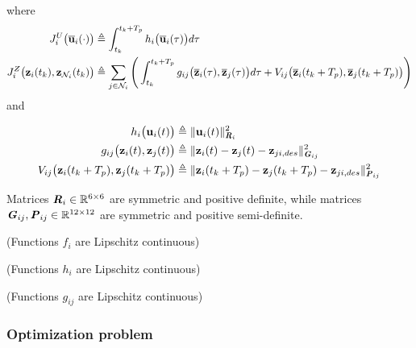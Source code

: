 where
\begin{align}
  J_i^U \big(\overline{\bm{\mathbf{u}}}_i (\cdot)\big) &\triangleq
    \int_{t_k}^{t_k + T_p} h_i \big(\overline{\bm{\mathbf{u}}}_i (\tau)\big) d \tau \\
  J_i^Z \big(\bm{\mathbf{z}}_i (t_k), \bm{\mathbf{z}}_{\mathcal{N}_i}(t_k)\big) & \triangleq
    \sum_{j \in \mathcal{N}_i} \Bigg(\int_{t_k}^{t_k + T_p} g_{ij} \big(\overline{\bm{\mathbf{z}}}_i (\tau), \overline{\bm{\mathbf{z}}}_j (\tau)\big) d \tau +
    V_{ij} \big(\overline{\bm{\mathbf{z}}}_i (t_k + T_p), \overline{\bm{\mathbf{z}}}_j (t_k + T_p)\big)\Bigg)
\end{align}
and

\begin{align}
  h_i \big(\bm{\mathbf{u}}_i(t) \big)
    &\triangleq \| \bm{\mathbf{u}}_i(t)\|_{\bm{\mathit{R}}_i}^2 \\
  g_{ij}\big(\bm{\mathbf{z}}_i(t), \bm{\mathbf{z}}_j(t)\big)
    & \triangleq \| \bm{\mathbf{z}}_i(t) - \bm{\mathbf{z}}_j(t) - \bm{\mathbf{z}}_{ji,des} \|_{\bm{\mathit{G}}_{ij}}^2 \\
  V_{ij} \big(\bm{\mathbf{z}}_i (t_k + T_p), \bm{\mathbf{z}}_j (t_k + T_p)\big)
    & \triangleq \| \bm{\mathbf{z}}_i(t_k + T_p) - \bm{\mathbf{z}}_j(t_k + T_p) - \bm{\mathbf{z}}_{ji,des} \|_{\bm{\mathit{P}}_{ij}}^2
\end{align}

Matrices $\bm{\mathit{R}}_i \in \mathbb{R}^{6 \times 6}$ are symmetric and positive
definite, while matrices $\bm{\mathit{G}}_{ij}, \bm{\mathit{P}}_{ij} \in \mathbb{R}^{12 \times 12}$ are
symmetric and positive semi-definite.

\begin{gg_box}
\begin{assumption} (Functions $f_i$ are Lipschitz continuous)
  \label{ass:f_i_Lipschitz}
\end{assumption}
\end{gg_box}

\begin{gg_box}
\begin{assumption} (Functions $h_i$ are Lipschitz continuous)
  \label{ass:h_i_Lipschitz}
\end{assumption}
\end{gg_box}

\begin{gg_box}
\begin{assumption} (Functions $g_{ij}$ are Lipschitz continuous)
  \label{ass:g_ij_Lipschitz}
\end{assumption}
\end{gg_box}


\subsubsection{Optimization problem}

